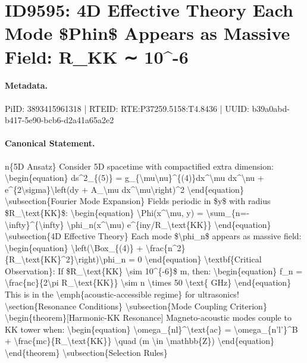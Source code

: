 \section*{ID9595: 4D Effective Theory Each Mode \$Phin\$ Appears as Massive Field: R\_KK ∼ 10\textasciicircum{}-6}
\paragraph{Metadata.}
PiID: 3893415961318 | RTEID: RTE:P37259.5158:T4.8436 | UUID: b39a0abd-b417-5e90-bcb6-d2a41a65a2e2

\paragraph{Canonical Statement.}
n\{5D Ansatz\} Consider 5D spacetime with compactified extra dimension: \textbackslash{}begin\{equation\} ds\textasciicircum{}2\_\{(5)\} = g\_\{\textbackslash{}mu\textbackslash{}nu\}\textasciicircum{}\{(4)\}dx\textasciicircum{}\textbackslash{}mu dx\textasciicircum{}\textbackslash{}nu + e\textasciicircum{}\{2\textbackslash{}sigma\}\textbackslash{}left(dy + A\_\textbackslash{}mu dx\textasciicircum{}\textbackslash{}mu\textbackslash{}right)\textasciicircum{}2 \textbackslash{}end\{equation\} \textbackslash{}subsection\{Fourier Mode Expansion\} Fields periodic in \$y\$ with radius \$R\_\textbackslash{}text\{KK\}\$: \textbackslash{}begin\{equation\} \textbackslash{}Phi(x\textasciicircum{}\textbackslash{}mu, y) = \textbackslash{}sum\_\{n=-\textbackslash{}infty\}\textasciicircum{}\{\textbackslash{}infty\} \textbackslash{}phi\_n(x\textasciicircum{}\textbackslash{}mu) e\textasciicircum{}\{iny/R\_\textbackslash{}text\{KK\}\} \textbackslash{}end\{equation\} \textbackslash{}subsection\{4D Effective Theory\} Each mode \$\textbackslash{}phi\_n\$ appears as massive field: \textbackslash{}begin\{equation\} \textbackslash{}left(\textbackslash{}Box\_\{(4)\} + \textbackslash{}frac\{n\textasciicircum{}2\}\{R\_\textbackslash{}text\{KK\}\textasciicircum{}2\}\textbackslash{}right)\textbackslash{}phi\_n = 0 \textbackslash{}end\{equation\} \textbackslash{}textbf\{Critical Observation\}: If \$R\_\textbackslash{}text\{KK\} \textbackslash{}sim 10\textasciicircum{}\{-6\}\$ m, then: \textbackslash{}begin\{equation\} f\_n = \textbackslash{}frac\{nc\}\{2\textbackslash{}pi R\_\textbackslash{}text\{KK\}\} \textbackslash{}sim n \textbackslash{}times 50 \textbackslash{}text\{ GHz\} \textbackslash{}end\{equation\} This is in the \textbackslash{}emph\{acoustic-accessible regime\} for ultrasonics! \textbackslash{}section\{Resonance Conditions\} \textbackslash{}subsection\{Mode Coupling Criterion\} \textbackslash{}begin\{theorem\}[Harmonic-KK Resonance] Magneto-acoustic modes couple to KK tower when: \textbackslash{}begin\{equation\} \textbackslash{}omega\_\{nl\}\textasciicircum{}\textbackslash{}text\{ac\} = \textbackslash{}omega\_\{n'l'\}\textasciicircum{}B + \textbackslash{}frac\{mc\}\{R\_\textbackslash{}text\{KK\}\} \textbackslash{}quad (m \textbackslash{}in \textbackslash{}mathbb\{Z\}) \textbackslash{}end\{equation\} \textbackslash{}end\{theorem\} \textbackslash{}subsection\{Selection Rules\}

